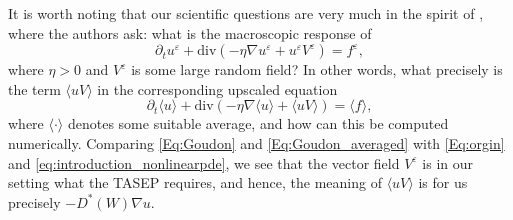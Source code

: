\documentclass[11pt]{article}
\newcommand{\V}{\textcolor{blue}}%
\def\es{\varepsilon}
\begin{document}
It is worth noting that our scientific questions are very much  in the spirit of \cite{Goudon}, where the authors ask: what is the macroscopic response of  
\begin{equation}\label{Eq:Goudon}
       \partial_t u^{\varepsilon} +\mathrm{div}(-\eta\nabla u^{\varepsilon} +
       u^\varepsilon V^\varepsilon)=f^{\varepsilon},
\end{equation} where $\eta>0$ and $V^\varepsilon$ is some large random field? 
In other words, what precisely is the term $\langle uV\rangle$ in the corresponding upscaled equation
\begin{equation}\label{Eq:Goudon_averaged}
       \partial_t \langle u\rangle +\mathrm{div}(-\eta\nabla \langle u \rangle +
       \langle uV\rangle)=\langle f \rangle,
\end{equation}
where $\langle\cdot\rangle$ denotes some suitable average, and how can this be computed numerically. 
Comparing \eqref{Eq:Goudon} and \eqref{Eq:Goudon_averaged} with \eqref{Eq:orgin} and \eqref{eq:introduction_nonlinearpde}, we see that the vector field $V^\varepsilon$ is in our setting what the TASEP requires, and hence, the meaning of $\langle uV\rangle$ is for us precisely $-D^*(W)\nabla u$. 
\end{document}
